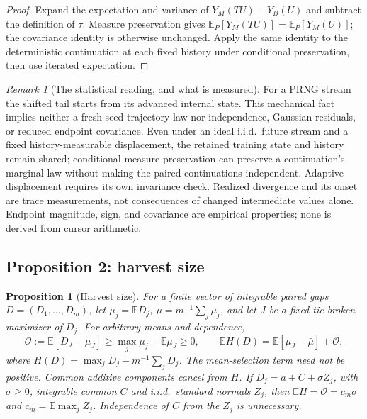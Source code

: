 \documentclass[10pt,letterpaper]{article}
\newtheorem{proposition}{Proposition}
\theoremstyle{remark}
\newtheorem*{remarkx}{Remark}
\begin{document}
\begin{proof}
Expand the expectation and variance of $Y_M(TU)-Y_B(U)$ and subtract the
definition of $\tau$. Measure preservation gives
$\mathbb E_P[Y_M(TU)]=\mathbb E_P[Y_M(U)]$; the covariance identity is
otherwise unchanged. Apply the same identity to the deterministic continuation
at each fixed history under conditional preservation, then use iterated
expectation.
\end{proof}

\begin{remarkx}[The statistical reading, and what is measured]
For a PRNG stream the shifted tail starts from its advanced internal state.
This mechanical fact implies neither a fresh-seed trajectory law nor
independence, Gaussian residuals, or reduced endpoint covariance. Even under
an ideal i.i.d.\ future stream and a fixed history-measurable displacement,
the retained training state and history remain shared; conditional
measure preservation can preserve a continuation's marginal law without
making the paired continuations independent. Adaptive displacement requires
its own invariance check. Realized divergence and its onset are trace
measurements, not consequences of changed intermediate values alone.
Endpoint magnitude, sign, and covariance are empirical properties; none is
derived from cursor arithmetic.
\end{remarkx}

\subsection{Proposition 2: harvest size}

\begin{proposition}[Harvest size]
\label{prop:harvest}
For a finite vector of integrable paired gaps $D=(D_1,\ldots,D_m)$, let
$\mu_j=\mathbb ED_j$, $\bar\mu=m^{-1}\sum_j\mu_j$, and let $J$ be a fixed
tie-broken maximizer of $D_j$. For arbitrary means and dependence,
\[
\mathcal O:=\mathbb E[D_J-\mu_J]
\ge\max_j\mu_j-\mathbb E\mu_J\ge0,\qquad
\mathbb EH(D)=\mathbb E[\mu_J-\bar\mu]+\mathcal O,
\]
where $H(D)=\max_jD_j-m^{-1}\sum_jD_j$. The mean-selection term need not be
positive. Common additive components cancel from $H$.
If $D_j=a+C+\sigma Z_j$, with $\sigma\ge0$, integrable common $C$ and i.i.d.\ standard
normals $Z_j$, then $\mathbb EH=\mathcal O=c_m\sigma$ and
$c_m=\mathbb E\max_jZ_j$. Independence of $C$ from the $Z_j$ is unnecessary.
\end{proposition}
\end{document}
